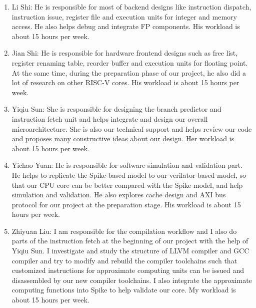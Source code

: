 \begin{enumerate}
  \item Li Shi: He is responsible for most of backend designs like instruction dispatch, instruction issue, register file and execution units for integer and memory access. He also helps debug and integrate FP components. His workload is about 15 hours per week.
  \item Jian Shi: He is responsible for hardware frontend designs such as free list, register renaming table, reorder buffer and execution units for floating point. At the same time, during the preparation phase of our project, he also did a lot of research on other RISC-V cores. His workload is about 15 hours per week.
  \item Yiqiu Sun: She is responsible for designing the branch predictor and instruction fetch unit and helps integrate and design our overall microarchitecture. She is also our technical support and helps review our code and proposes many constructive ideas about our design. Her workload is about 15 hours per week.
  \item Yichao Yuan: He is responsible for software simulation and validation part. He helps to replicate the Spike-based model to our verilator-based model, so that our CPU core can be better compared with the Spike model, and help simulation and validation. He also explores cache design and AXI bus protocol for our project at the preparation stage. His workload is about 15 hours per week.
  \item Zhiyuan Liu: I am responsible for the compilation workflow and I also do parts of the instruction fetch at the beginning of our project with the help of Yiqiu Sun. I investigate and study the structure of LLVM compiler and GCC compiler and try to modify and rebuild the compiler toolchains such that customized instructions for approximate computing units can be issued and disassembled by our new compiler toolchains. I also integrate the approximate computing functions into Spike to help validate our core. My workload is about 15 hours per week.
\end{enumerate}

